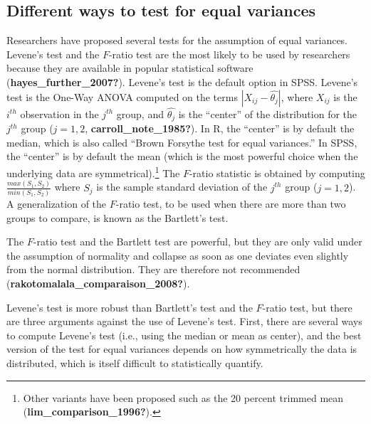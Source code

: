 \documentclass[
  english,
  man]{apa6}
\begin{document}
\hypertarget{different-ways-to-test-for-equal-variances}{%
\subsection{Different ways to test for equal variances}\label{different-ways-to-test-for-equal-variances}}

Researchers have proposed several tests for the assumption of equal variances. Levene's test and the \(F\)-ratio test are the most likely to be used by researchers because they are available in popular statistical software (\textbf{hayes\_further\_2007?}). Levene's test is the default option in SPSS. Levene's test is the One-Way ANOVA computed on the terms \(|X_{ij}-\hat{\theta_j}|\), where \(X_{ij}\) is the \(i^{th}\) observation in the \(j^{th}\) group, and \(\hat{\theta_j}\) is the ``center'' of the distribution for the \(j^{th}\) group (\(j=1,2\), \textbf{carroll\_note\_1985?}). In R, the ``center'' is by default the median, which is also called ``Brown Forsythe test for equal variances.'' In SPSS, the ``center'' is by default the mean (which is the most powerful choice when the underlying data are symmetrical).\footnote{ Other variants have been proposed such as the 20 percent trimmed mean (\textbf{lim\_comparison\_1996?}).} The \(F\)-ratio statistic is obtained by computing \(\frac{max(S_1,S_2)}{min(S_1,S_2)}\) where \(S_j\) is the sample standard deviation of the \(j^{th}\) group (\(j=1,2\)). A generalization of the \(F\)-ratio test, to be used when there are more than two groups to compare, is known as the Bartlett's test.

The \(F\)-ratio test and the Bartlett test are powerful, but they are only valid under the assumption of normality and collapse as soon as one deviates even slightly from the normal distribution. They are therefore not recommended (\textbf{rakotomalala\_comparaison\_2008?}).

Levene's test is more robust than Bartlett's test and the \(F\)-ratio test, but there are three arguments against the use of Levene's test. First, there are several ways to compute Levene's test (i.e., using the median or mean as center), and the best version of the test for equal variances depends on how symmetrically the data is distributed, which is itself difficult to statistically quantify.
\end{document}

